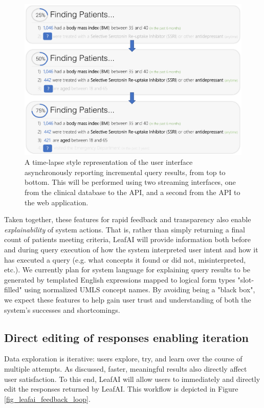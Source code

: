 \documentclass[../main.tex]{subfiles}
\begin{document}
\begin{figure}[h!]
  \centering
  \includegraphics[scale=0.5]{Figures/8_web_application/leafai_query_progress.pdf}  
  \caption{A time-lapse style representation of the user interface asynchronously reporting incremental query results, from top to bottom. This will be performed using two streaming interfaces, one from the clinical database to the API, and a second from the API to the web application.}
\label{fig_leafai_query_progress}
\end{figure}

Taken together, these features for rapid feedback and transparency also enable \textit{explainability} of system actions. That is, rather than simply returning a final count of patients meeting criteria, LeafAI will provide information both before and during query execution of how the system interpreted user intent and how it has executed a query (e.g. what concepts it found or did not, misinterpreted, etc.). We currently plan for system language for explaining query results to be generated by templated English expressions mapped to logical form types "slot-filled" using normalized UMLS concept names. By avoiding being a "black box", we expect these features to help gain user trust and understanding of both the system's successes and shortcomings.

\subsection{Direct editing of responses enabling iteration}

Data exploration is iterative: users explore, try, and learn over the course of multiple attempts. As discussed, faster, meaningful results also directly affect user satisfaction. To this end, LeafAI will allow users to immediately and directly edit the responses returned by LeafAI. This workflow is depicted in Figure \ref{fig_leafai_feedback_loop}. 
\end{document}

